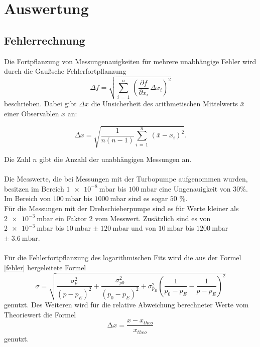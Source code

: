 \newpage 
\section{Auswertung}

        \subsection{Fehlerrechnung}
        \noindent
        Die Fortpflanzung von Messungenauigkeiten für mehrere unabhängige Fehler wird durch die Gaußsche Fehlerfortpflanzung
        \begin{equation*}
        \Delta f = \sqrt{\sum_{i \, = \, 1}^{n} \, \left(\frac{\partial f}{\partial x_i} \, \Delta x_i\right)^2}
        \label{fehler}
        \end{equation*}
        beschrieben. Dabei gibt $\Delta x$ die Unsicherheit des arithmetischen Mittelwerts $\bar{x}$ einer Observablen $x$ an:
        
        \begin{equation*}
        \Delta x =  \sqrt{\frac{1}{n(n-1)} \sum_{i \, = \, 1}^{n} \, \left(\bar{x}- x_i\right)^2}.
        \end{equation*}

        \noindent
        Die Zahl $n$ gibt die Anzahl der unabhängigen Messungen an.\\\\
        Die Messwerte, die bei Messungen mit der Turbopumpe aufgenommen wurden, besitzen im Bereich $\SI{1e-8}{\milli\bar}$ bis $\SI{100}{\milli\bar}$ eine Ungenauigkeit von $30$\%.
        Im Bereich von $\SI{100}{\milli\bar}$ bis $\SI{1000}{\milli\bar}$ sind es sogar $50$ \%.\\
        Für die Messungen mit der Drehschieberpumpe sind es für Werte kleiner als $\SI{2e-3}{\milli\bar}$ ein Faktor $2$ vom Messwert.
        Zusätzlich sind es von $\SI{2e-3}{\milli\bar}$ bis $\SI{10}{\milli\bar}$ $\pm\; \SI{120}{\milli\bar}$ 
        und von $\SI{10}{\milli\bar}$ bis $\SI{1200}{\milli\bar}$ $\pm \;\SI{3.6}{\milli\bar}$.\\\\
        Für die Fehlerfortpflanzung des logarithmischen Fits wird die aus der Formel \ref*{fehler} hergeleitete Formel 
        \begin{equation*}
          \sigma = \sqrt{\frac{\sigma_p^2}{(p-p_E)^2}+\frac{\sigma_{p0}^2}{(p_0-p_E)^2}+\sigma_{p_E}^2 \left(\frac{1}{p_0-p_E}-\frac{1}{p-p_E}\right)^2}
        \end{equation*}
        genutzt. Des Weiteren wird für die relative Abweichung berechneter Werte vom Theoriewert die Formel 
        \begin{equation*}
          \increment x = \frac{x - x_{theo}}{x_{theo}}
        \end{equation*}
        genutzt.

